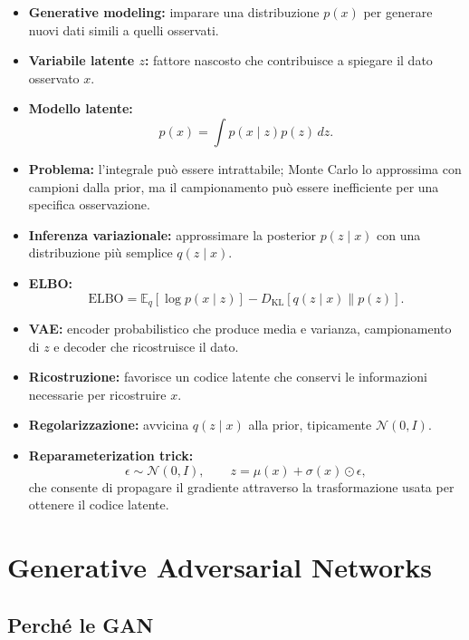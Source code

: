 \documentclass[11pt,a4paper]{article}
\providecommand{\E}{\mathbb{E}}
\providecommand{\DKL}{D_{\mathrm{KL}}}
\providecommand{\Normal}{\mathcal{N}}
\begin{document}
\begin{itemize}
    \item \textbf{Generative modeling:} imparare una distribuzione $p(x)$ per generare nuovi dati simili a quelli osservati.
    \item \textbf{Variabile latente $z$:} fattore nascosto che contribuisce a spiegare il dato osservato $x$.
    \item \textbf{Modello latente:}
    \[
    p(x)=\int p(x\mid z)p(z)\,dz.
    \]
    \item \textbf{Problema:} l'integrale può essere intrattabile; Monte Carlo lo approssima con campioni dalla prior, ma il campionamento può essere inefficiente per una specifica osservazione.
    \item \textbf{Inferenza variazionale:} approssimare la posterior $p(z\mid x)$ con una distribuzione più semplice $q(z\mid x)$.
    \item \textbf{ELBO:}
    \[
    \mathrm{ELBO}
    =
    \E_q[\log p(x\mid z)]
    -
    \DKL[q(z\mid x)\|p(z)].
    \]
    \item \textbf{VAE:} encoder probabilistico che produce media e varianza, campionamento di $z$ e decoder che ricostruisce il dato.
    \item \textbf{Ricostruzione:} favorisce un codice latente che conservi le informazioni necessarie per ricostruire $x$.
    \item \textbf{Regolarizzazione:} avvicina $q(z\mid x)$ alla prior, tipicamente $\Normal(0,I)$.
    \item \textbf{Reparameterization trick:}
    \[
    \epsilon\sim\Normal(0,I),
    \qquad
    z=\mu(x)+\sigma(x)\odot\epsilon,
    \]
    che consente di propagare il gradiente attraverso la trasformazione usata per ottenere il codice latente.
\end{itemize}

\section{Generative Adversarial Networks}

\subsection{Perché le GAN}
\end{document}
